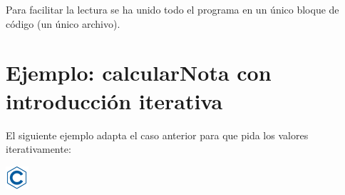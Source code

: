 \documentclass[
]{book}
\begin{document}
Para facilitar la lectura se ha unido todo el programa en un único bloque de código (un único archivo).

\hypertarget{ejemplo-calcularnota-con-introducciuxf3n-iterativa}{%
\section{Ejemplo: calcularNota con introducción iterativa}\label{ejemplo-calcularnota-con-introducciuxf3n-iterativa}}

El siguiente ejemplo adapta el caso anterior para que pida los valores iterativamente:

\includegraphics{./img/c.png}
\end{document}
